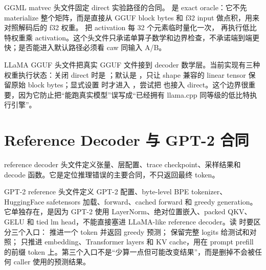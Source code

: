 GGML matvec 头文件固定  direct 实验路径的合同。 是 exact oracle：它不先 materialize 整个矩阵，而是直接从 GGUF block bytes 和 f32 input 做点积，用来对照解码后的 f32 权重。 把 activation 每 32 个元素临时量化一次， 再执行低比特权重乘  activation。这个头文件只承诺单算子数学和边界检查，不承诺端到端更快；是否能进入默认路径必须看 caw 同输入 A/B。



LLaMA GGUF 头文件把真实 GGUF 文件接到 decoder 数学层。当前实现有三种权重执行状态：关闭 direct 时是 ；默认是 ，只让 shape 兼容的  linear tensor 保留原始 block bytes；显式设置  时才进入 ，尝试把  也接入 direct。这个边界很重要，因为它防止把“能跑真实模型”误写成“已经拥有 llama.cpp 同等级的低比特执行引擎”。



\section{Reference Decoder 与 GPT-2 合同}

reference decoder 头文件定义张量、层配置、trace checkpoint、采样结果和 decode 函数。它是定位推理错误的主要合同，不只返回最终 token。



GPT-2 reference 头文件定义 GPT-2 配置、byte-level BPE tokenizer、HuggingFace safetensors 加载、forward、cached forward 和 greedy generation。它单独存在，是因为 GPT-2 使用 LayerNorm、绝对位置嵌入、packed QKV、GELU 和 tied lm head，不能直接塞进 LLaMA-like reference decoder。读  时要区分三个入口： 推进一个 token 并返回 greedy 预测； 保留完整 logits 给测试和对照； 只推进 embedding、Transformer layers 和 KV cache，用在 prompt prefill 的前缀 token 上。第三个入口不是“少算一点但可能改变结果”，而是删掉不会被任何 caller 使用的预测结果。


